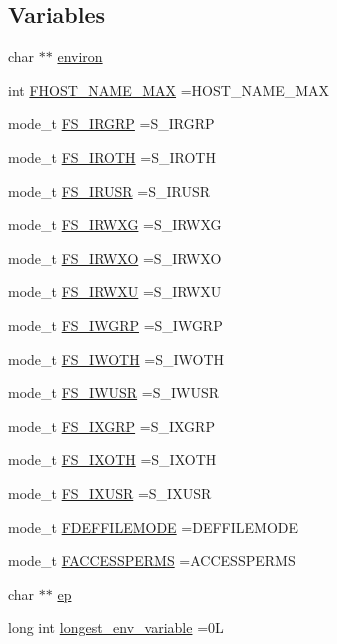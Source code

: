 \subsection*{Variables}
\begin{DoxyCompactItemize}
\item 
char $\ast$$\ast$ \hyperlink{C-M__system_8c_aa006daaf11f1e2e45a6ababaf463212b}{environ}
\item 
int \hyperlink{C-M__system_8c_a55fec1e650e6037d352db493bea1716f}{F\+H\+O\+S\+T\+\_\+\+N\+A\+M\+E\+\_\+\+M\+AX} =H\+O\+S\+T\+\_\+\+N\+A\+M\+E\+\_\+\+M\+AX
\item 
mode\+\_\+t \hyperlink{C-M__system_8c_a9e37e108fa1a58b85031aed8634f65d0}{F\+S\+\_\+\+I\+R\+G\+RP} =S\+\_\+\+I\+R\+G\+RP
\item 
mode\+\_\+t \hyperlink{C-M__system_8c_a310094a449c3371ef9cf8b0776213835}{F\+S\+\_\+\+I\+R\+O\+TH} =S\+\_\+\+I\+R\+O\+TH
\item 
mode\+\_\+t \hyperlink{C-M__system_8c_a03e3496451f60edd6c69c3802e11db67}{F\+S\+\_\+\+I\+R\+U\+SR} =S\+\_\+\+I\+R\+U\+SR
\item 
mode\+\_\+t \hyperlink{C-M__system_8c_ab4e744ca243de9628a7e9651695d7a97}{F\+S\+\_\+\+I\+R\+W\+XG} =S\+\_\+\+I\+R\+W\+XG
\item 
mode\+\_\+t \hyperlink{C-M__system_8c_a612adf3e64ccb1734ab64ef6d73fa87b}{F\+S\+\_\+\+I\+R\+W\+XO} =S\+\_\+\+I\+R\+W\+XO
\item 
mode\+\_\+t \hyperlink{C-M__system_8c_acb420eb45e494ab53bbfd018c2262ff2}{F\+S\+\_\+\+I\+R\+W\+XU} =S\+\_\+\+I\+R\+W\+XU
\item 
mode\+\_\+t \hyperlink{C-M__system_8c_a739522a271fd37727d6f266197ded32b}{F\+S\+\_\+\+I\+W\+G\+RP} =S\+\_\+\+I\+W\+G\+RP
\item 
mode\+\_\+t \hyperlink{C-M__system_8c_a1ed0df6f1e0108d07c0fe7880402f8c0}{F\+S\+\_\+\+I\+W\+O\+TH} =S\+\_\+\+I\+W\+O\+TH
\item 
mode\+\_\+t \hyperlink{C-M__system_8c_ade549697e7611d5c3755b1befcd796b8}{F\+S\+\_\+\+I\+W\+U\+SR} =S\+\_\+\+I\+W\+U\+SR
\item 
mode\+\_\+t \hyperlink{C-M__system_8c_ac01832589f29b7d987cb90be63cc3dc8}{F\+S\+\_\+\+I\+X\+G\+RP} =S\+\_\+\+I\+X\+G\+RP
\item 
mode\+\_\+t \hyperlink{C-M__system_8c_aafbcf1020ef1a8f3999526f88f349fe3}{F\+S\+\_\+\+I\+X\+O\+TH} =S\+\_\+\+I\+X\+O\+TH
\item 
mode\+\_\+t \hyperlink{C-M__system_8c_acc949c15ea63678fc34579213919906f}{F\+S\+\_\+\+I\+X\+U\+SR} =S\+\_\+\+I\+X\+U\+SR
\item 
mode\+\_\+t \hyperlink{C-M__system_8c_a4ec9ddefca39a5f2bc0aa0cb9cc8a760}{F\+D\+E\+F\+F\+I\+L\+E\+M\+O\+DE} =D\+E\+F\+F\+I\+L\+E\+M\+O\+DE
\item 
mode\+\_\+t \hyperlink{C-M__system_8c_a2d221d0dde92c4e100c2bc959832f1df}{F\+A\+C\+C\+E\+S\+S\+P\+E\+R\+MS} =A\+C\+C\+E\+S\+S\+P\+E\+R\+MS
\item 
char $\ast$$\ast$ \hyperlink{C-M__system_8c_a8f6f268f0282f4a41c1569e80963f328}{ep}
\item 
long int \hyperlink{C-M__system_8c_ad45ba6068349b626136d161ff72dea21}{longest\+\_\+env\+\_\+variable} =0L
\end{DoxyCompactItemize}


